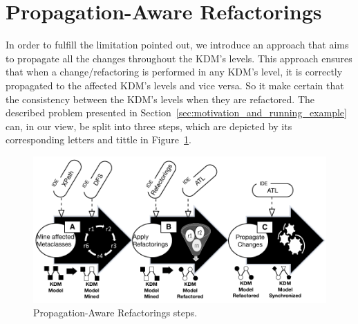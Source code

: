 
\section{Propagation-Aware Refactorings} %
\label{sec:the_approach}

In order to fulfill the limitation pointed out, we introduce an approach that aims to propagate all the changes throughout the KDM's levels. This approach ensures that when a change/refactoring is performed in any KDM's level, it is correctly propagated to the affected KDM's levels and vice versa. So it make certain that the consistency between the KDM's levels when they are refactored. 
The described problem presented in Section~\ref{sec:motivation_and_running_example} can, in our view, be split into three steps, which are depicted by its corresponding letters and tittle in Figure~\ref{fig:approach}. 



\begin{figure}[h]
	\centering
	\includegraphics[scale=0.56]{figuras/allStepApproachKDMPropagation}
	\caption{Propagation-Aware Refactorings steps.}
	\label{fig:approach}
\end{figure}

